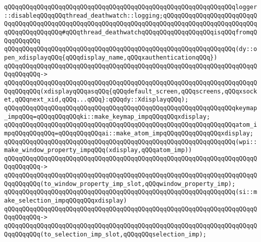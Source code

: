 \verb|qQQqqQQqqQQqqQQqqQQqqQQqqQQqqQQqqQQqqQQqqQQqqQQqqQQqqQQqqQQqqQQqlogger::disableqQQqqQQqthread_deathwatch::logging;qQQqqQQqqQQqqQQqqQQqqQQqqQQqqQQqqQQqqQQqqQQqqQQqqQQqqQQqqQQqqQQqqQQqqQQqqQQqqQQqqQQqqQQqqQQqqQQqqQQqqQQqqQQqqQQq#qQQqthread_deathwatchqQQqqQQqqQQqqQQqqQQqisqQQqfromqQQqqQQqqQQq|\newline
\newline
\verb|qQQqqQQqqQQqqQQqqQQqqQQqqQQqqQQqqQQqqQQqqQQqqQQqqQQqqQQqqQQqqQQq(dy::open_xdisplayqQQq{qQQqdisplay_name,qQQqxauthenticationqQQq})|\newline
\verb|qQQqqQQqqQQqqQQqqQQqqQQqqQQqqQQqqQQqqQQqqQQqqQQqqQQqqQQqqQQqqQQqqQQqqQQqqQQqqQQq->|\newline
\verb|qQQqqQQqqQQqqQQqqQQqqQQqqQQqqQQqqQQqqQQqqQQqqQQqqQQqqQQqqQQqqQQqqQQqqQQqqQQqqQQq(xdisplayqQQqasqQQq{qQQqdefault_screen,qQQqscreens,qQQqxsocket,qQQqnext_xid,qQQq...qQQq}:qQQqdy::XdisplayqQQq);|\newline
\newline
\verb|qQQqqQQqqQQqqQQqqQQqqQQqqQQqqQQqqQQqqQQqqQQqqQQqqQQqqQQqqQQqqQQqkeymap_impqQQq=qQQqqQQqqQQqki::make_keymap_impqQQqqQQqxdisplay;|\newline
\verb|qQQqqQQqqQQqqQQqqQQqqQQqqQQqqQQqqQQqqQQqqQQqqQQqqQQqqQQqqQQqqQQqatom_impqQQqqQQqqQQq=qQQqqQQqqQQqai::make_atom_impqQQqqQQqqQQqqQQqxdisplay;|\newline
\newline
\verb|qQQqqQQqqQQqqQQqqQQqqQQqqQQqqQQqqQQqqQQqqQQqqQQqqQQqqQQqqQQqqQQq(wpi::make_window_property_impqQQq(xdisplay,qQQqatom_imp))|\newline
\verb|qQQqqQQqqQQqqQQqqQQqqQQqqQQqqQQqqQQqqQQqqQQqqQQqqQQqqQQqqQQqqQQqqQQqqQQqqQQqqQQq->|\newline
\verb|qQQqqQQqqQQqqQQqqQQqqQQqqQQqqQQqqQQqqQQqqQQqqQQqqQQqqQQqqQQqqQQqqQQqqQQqqQQqqQQq(to_window_property_imp_slot,qQQqwindow_property_imp);|\newline
\newline
\verb|qQQqqQQqqQQqqQQqqQQqqQQqqQQqqQQqqQQqqQQqqQQqqQQqqQQqqQQqqQQqqQQq(si::make_selection_impqQQqqQQqxdisplay)|\newline
\verb|qQQqqQQqqQQqqQQqqQQqqQQqqQQqqQQqqQQqqQQqqQQqqQQqqQQqqQQqqQQqqQQqqQQqqQQqqQQqqQQq->|\newline
\verb|qQQqqQQqqQQqqQQqqQQqqQQqqQQqqQQqqQQqqQQqqQQqqQQqqQQqqQQqqQQqqQQqqQQqqQQqqQQqqQQq(to_selection_imp_slot,qQQqqQQqselection_imp);|\newline
